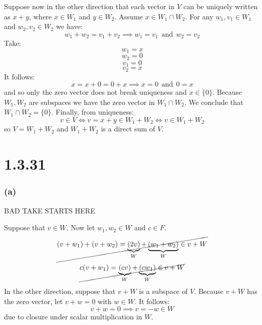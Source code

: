 \documentclass{article}
\begin{document}
Suppose now in the other direction that each vector in \(V\) can be uniquely written as 
\(x + y\), where \(x \in W_{1}\) and \(y \in W_{2}\). Assume \(x \in W_{1} \cap W_{2}\).
For any \(w_{1}, v_{1} \in W_{1}\) and \(w_{2}, v_{2} \in W_{2}\) we have:
\begin{equation*}
    w_{1} + w_{2} = v_{1} + v_{2} \implies w_{1} = v_{1} \ \ \mbox{and} \ \ w_{2} = v_{2}
\end{equation*}
Take:
\begin{equation*}
    w_{1} = x 
\end{equation*}
\begin{equation*}
    w_{2} = 0  
\end{equation*}
\begin{equation*}
    v_{1} = 0 
\end{equation*}
\begin{equation*}
    v_{2} = x 
\end{equation*}
It follows:
\begin{equation*}
    x = x + 0 = 0 + x \implies x = 0 \ \ \mbox{and} \ \ 0 = x
\end{equation*}
and so only the zero vector does not break uniqueness and \(x \in \{0\}\). Because \(W_{1}, W_{2}\) are
subspaces we have the zero vector in \(W_{1} \cap W_{2}\). We conclude that \(W_{1} \cap W_{2} = \{0\}\).
%
Finally, from uniqueness:
\begin{equation*}
     v \in V \iff v = x + y \in W_{1} + W_{2} \iff  v \in W_{1} + W_{2}
\end{equation*}
so \(V = W_{1} + W_{2}\) and \(W_{1} + W_{2}\) is a direct sum of \(V\). 

\section*{1.3.31}

\subsubsection*{(a)}

\begin{center}
    BAD TAKE STARTS HERE
\end{center}

Suppose that \(v \in W\). 
Now let \(w_{1}, w_{2} \in W\) and \(c \in F\). 
\begin{equation*}
    \cancel{(v + w_{1}) + (v + w_{2}) = \underbrace{(2v)}_{W} + \underbrace{(w_{1} + w_{2})}_{W} \in v + W}
\end{equation*}
\begin{equation*}
    \cancel{c(v + w_{1}) = \underbrace{(cv)}_{W} + \underbrace{(cw_{1})}_{W} \in v + W}
\end{equation*}
In the other direction, suppose that \(v + W\) is a subspace of \(V\). Because
\(v + W\) has the zero vector, let \(v + w = 0\) with \(w \in W\). It follows:
\begin{equation*}
    v + w = 0 \implies v = -w \in W
\end{equation*}
due to closure under scalar multiplication in \(W\).
\end{document}
